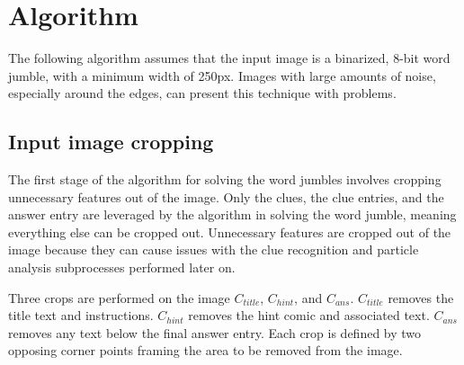 \documentclass{article}
\begin{document}
	\section{Algorithm}
	The following algorithm assumes that the input image is a binarized, 8-bit word jumble, with a minimum width of 250px.  Images with large amounts of noise, especially around the edges, can present this technique with problems.
	\subsection{Input image cropping}
	The first stage of the algorithm for solving the word jumbles involves cropping unnecessary features out of the image.  Only the clues, the clue entries, and the answer entry are leveraged by the algorithm in solving the word jumble, meaning everything else can be cropped out. Unnecessary features are cropped out of the image because they can cause issues with the clue recognition and particle analysis subprocesses performed later on. \par
	Three crops are performed on the image $C_{title}$, $C_{hint}$, and $C_{ans}$.  $C_{title}$ removes the title text and instructions.  $C_{hint}$ removes the hint comic and associated text.  $C_{ans}$ removes any text below the final answer entry.  Each crop is defined by two opposing corner points framing the area to be removed from the image.
	
\end{document}
